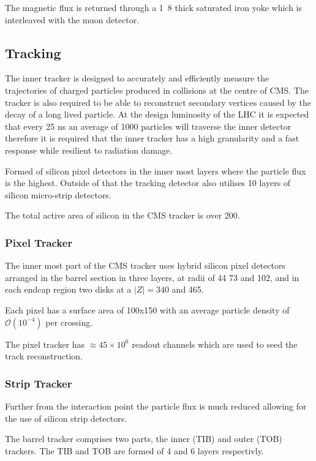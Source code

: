 The magnetic flux is returned through a \unit{1.8}{\meter} thick saturated iron
yoke which is interleaved with the muon detector.

\subsection{Tracking}
The inner tracker is designed to accurately and efficiently measure the
trajectories of charged particles produced in collisions at the centre of CMS.
The tracker is also required to be able to reconstruct secondary vertices
caused by the decay of a long lived particle.
At the design luminosity of the LHC it is expected that every 25 ns an average
of 1000 particles will traverse the 
inner detector therefore it is required that the inner tracker has a high
granularity and a fast response while 
resilient to radiation damage. 

Formed of silicon pixel detectors in the inner most layers where the particle
flux is the highest.
Outside of that the tracking detector also utilises 10 layers of silicon
micro-strip detectors.

The total active area of silicon in the CMS tracker is over
\unit{200}{\meter\squared}.\cite{cms}

\subsubsection{Pixel Tracker}
The inner most part of the CMS tracker uses hybrid silicon pixel detectors arranged in
the barrel section in three layers, at radii of  44 73 and \unit{102}{\mm}, and in
each endcap region two disks at a $|Z|=340$ and \unit{465}{\mm}.

Each pixel has a surface area of \unit{100x150}{\micron} with an
average particle density of $\mathcal{O}(10^{-4})$ per crossing.

The pixel tracker has $\approx 45\times 10^{6}$ readout channels which are used
to seed the track reconstruction.

\subsubsection{Strip Tracker}
Further from the interaction point the particle flux is much reduced allowing
for the use of silicon strip detectors. 

The barrel tracker comprises two parts, the inner (TIB) and outer (TOB)
trackers. The TIB and TOB are formed of 4 and 6 layers respectivly.

